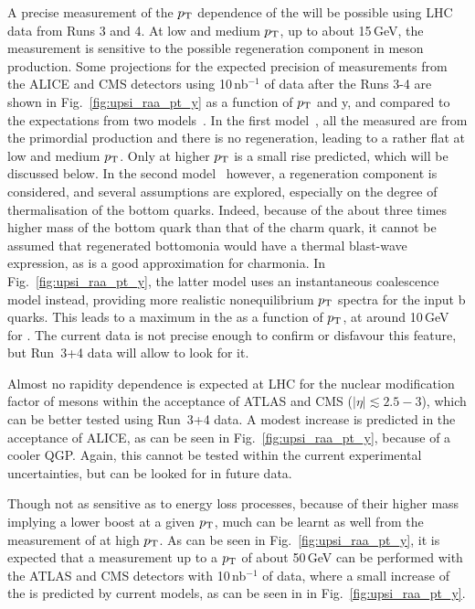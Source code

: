 \documentclass[../report.tex]{subfiles}
\begin{document}
A precise measurement of the $p_{\rm T}$ dependence of the  \raa will be possible using LHC data from Runs 3 and 4. At low and medium $p_{\rm T}$, up to about 15\,GeV, the measurement is
sensitive to the possible regeneration component in \PGU meson production. Some projections for the expected precision of \PGU measurements from the ALICE and CMS detectors
using 10\,nb$^{-1}$ of data after the Runs 3-4 are shown in Fig.~\ref{fig:upsi_raa_pt_y} as a function of $p_{\rm T}$ and y, and compared to the expectations from two 
models~\cite{Krouppa:2017jlg,Du:2017qkv}. In the first model~\cite{Krouppa:2017jlg}, all the measured \PGU are from the primordial production and there is no regeneration, leading
to a rather flat \raa at low and medium $p_{\rm T}$. Only at higher $p_{\rm T}$ is a small rise predicted, which will be discussed below. In the second model~\cite{Du:2017qkv} however, a regeneration
component is considered, and several assumptions are explored, especially on the degree of thermalisation of the bottom quarks. Indeed, because of the about three times higher mass of
the bottom quark than that of the charm quark, it cannot be assumed that regenerated bottomonia would have a thermal blast-wave expression, as is a good approximation for charmonia.
In Fig.~\ref{fig:upsi_raa_pt_y}, the latter model uses an instantaneous coalescence model instead, providing more realistic nonequilibrium $p_{\rm T}$ spectra for the input b quarks. 
This leads to a maximum in the \raa as a function of $p_{\rm T}$, at around 10\,GeV for . The current data is not precise enough to confirm or disfavour this feature, but Run~3+4 
data will allow to look for it.

Almost no rapidity dependence is expected at LHC for the nuclear modification factor of \PGU mesons within the acceptance of ATLAS and CMS ($|\eta|\lesssim 2.5-3$), which can be better
tested using Run~3+4 data. A modest increase is predicted in the acceptance of ALICE, as can be seen in Fig.~\ref{fig:upsi_raa_pt_y}, because of a cooler QGP. Again, this cannot be tested
within the current experimental uncertainties, but can be looked for in future data.

Though not as sensitive as \PJgy to energy loss processes, because of their higher mass implying a lower boost at a given $p_{\rm T}$, much can be learnt as well from the measurement of
 at high $p_{\rm T}$. As can be seen in Fig.~\ref{fig:upsi_raa_pt_y}, it is expected that a measurement up to a $p_{\rm T}$ of about 50\,GeV can be performed with the ATLAS and CMS detectors with
10\,nb$^{-1}$ of data, where a small increase of the \raa is predicted by current models, as can be seen in in Fig.~\ref{fig:upsi_raa_pt_y}.
\end{document}
